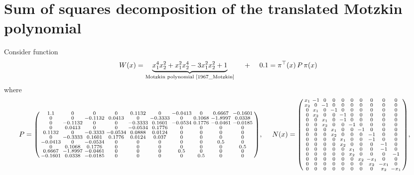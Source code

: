 \documentclass[fleqn]{article}
\begin{document}
\section{Sum of squares decomposition of the translated Motzkin polynomial}
Consider function
\begin{equation}
    W(x) = \underbrace{x_{1}^4x_{2}^2+x_{1}^2x_{2}^4-3x_{1}^2x_{2}^2+1}_{\text{Motzkin polynomial \cite{1967_Motzkin}}} ~~~~ + ~~~~ 0.1 = \pi^\top(x) \, P \, \pi(x)
\end{equation}
where
\begin{equation}
    P = \spmqty{ 1.1 & 0 & 0 & 0 & 0.1132 & 0 & -0.0413 & 0 & 0.6667 & -0.1601 \\ 0 & 0 & -0.1132 & 0.0413 & 0 & -0.3333 & 0 & 0.1068 & -1.8997 & 0.0338 \\ 0 & -0.1132 & 0 & 0 & -0.3333 & 0.1601 & -0.0534 & 0.1776 & -0.0461 & -0.0185 \\ 0 & 0.0413 & 0 & 0 & -0.0534 & 0.1776 & 0 & 0 & 0 & 0 \\ 0.1132 & 0 & -0.3333 & -0.0534 & 0.0888 & 0.0124 & 0 & 0 & 0 & 0 \\ 0 & -0.3333 & 0.1601 & 0.1776 & 0.0124 & 0.037 & 0 & 0 & 0 & 0 \\ -0.0413 & 0 & -0.0534 & 0 & 0 & 0 & 0 & 0 & 0.5 & 0 \\ 0 & 0.1068 & 0.1776 & 0 & 0 & 0 & 0 & 0 & 0 & 0.5 \\ 0.6667 & -1.8997 & -0.0461 & 0 & 0 & 0 & 0.5 & 0 & 0 & 0 \\ -0.1601 & 0.0338 & -0.0185 & 0 & 0 & 0 & 0 & 0.5 & 0 & 0 },~~~~
    N(x) = \spmqty{ x_{1} & -1 & 0 & 0 & 0 & 0 & 0 & 0 & 0 & 0 \\ x_{2} & 0 & -1 & 0 & 0 & 0 & 0 & 0 & 0 & 0 \\ 0 & x_{1} & 0 & -1 & 0 & 0 & 0 & 0 & 0 & 0 \\ 0 & x_{2} & 0 & 0 & -1 & 0 & 0 & 0 & 0 & 0 \\ 0 & 0 & x_{1} & 0 & -1 & 0 & 0 & 0 & 0 & 0 \\ 0 & 0 & x_{2} & 0 & 0 & -1 & 0 & 0 & 0 & 0 \\ 0 & 0 & 0 & x_{1} & 0 & 0 & -1 & 0 & 0 & 0 \\ 0 & 0 & 0 & x_{2} & 0 & 0 & 0 & -1 & 0 & 0 \\ 0 & 0 & 0 & 0 & x_{1} & 0 & 0 & -1 & 0 & 0 \\ 0 & 0 & 0 & 0 & x_{2} & 0 & 0 & 0 & -1 & 0 \\ 0 & 0 & 0 & 0 & 0 & x_{1} & 0 & 0 & -1 & 0 \\ 0 & 0 & 0 & 0 & 0 & x_{2} & 0 & 0 & 0 & -1 \\ 0 & 0 & 0 & 0 & 0 & 0 & x_{2} & -x_{1} & 0 & 0 \\ 0 & 0 & 0 & 0 & 0 & 0 & 0 & x_{2} & -x_{1} & 0 \\ 0 & 0 & 0 & 0 & 0 & 0 & 0 & 0 & x_{2} & -x_{1} },~~~

\end{equation}
\end{document}
